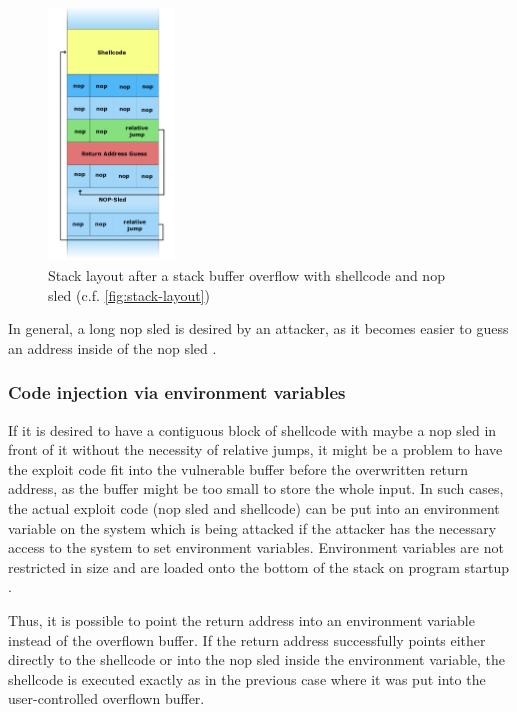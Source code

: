 \begin{figure}[htb]
	\centering
	\includegraphics[width=0.3\textwidth]{figures/NopSled}
	\caption{Stack layout after a stack buffer overflow with shellcode and \acrshort{nop} sled \cite{Lynn2007c} (c.f. \cref{fig:stack-layout})}
	\label{fig:stack-overflow-nop-sled}
\end{figure}

In general, a long \acrshort{nop} sled is desired by an attacker, as it becomes easier to guess an address inside of the \acrshort{nop} sled \cite{AlephOne1996}.

\subsubsection{Code injection via environment variables}
\label{subsubsec:ci-via-env-variable}

If it is desired to have a contiguous block of shellcode with maybe a \acrshort{nop} sled in front of it without the necessity of relative jumps, it might be a problem to have the exploit code fit into the vulnerable buffer before the overwritten return address, as the buffer might be too small to store the whole input.
In such cases, the actual exploit code (\acrshort{nop} sled and shellcode) can be put into an environment variable on the system which is being attacked if the attacker has the necessary access to the system to set environment variables.
Environment variables are not restricted in size and are loaded onto the bottom of the stack on program startup \cite[731\psq]{Bryant2011}.

Thus, it is possible to point the return address into an environment variable instead of the overflown buffer.
If the return address successfully points either directly to the shellcode or into the \acrshort{nop} sled inside the environment variable, the shellcode is executed exactly as in the previous case where it was put into the user-controlled overflown buffer.

